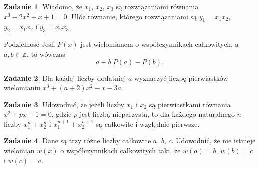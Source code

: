 \documentclass{uoom}
\theoremstyle{definition}
\newtheorem{zadd}{Zadanie}
\newenvironment{zadanie}{
  \begin{zadd}
  }
  {
    \end{zadd}\vspace{\ooodstep}
  }
\def\Z{\mathbb{Z}}
\begin{document}

%

\begin{zadanie}
  Wiadomo, że $x_1$, $x_2$, $x_3$ są rozwiązaniami równania $x^3-2x^2+x+1=0$. Ułóż równanie, którego rozwiązaniami są $y_1=x_1x_2$, $y_2=x_1x_2$ i $y_3=x_2x_3$.
\end{zadanie}

\begin{mybox}{Podzielność}
  Jeśli $P(x)$ jest wielomianem o współczynnikach całkowitych, a $a,b\in\Z$, to wówczas
  $$a-b|P(a)-P(b).$$
\end{mybox}


\begin{zadanie}
  Dla każdej liczby dodatniej $a$ wyznaczyć liczbę pierwiastków wielomianiu $x^3+(a+2)x^2-x-3a$.
\end{zadanie}

\begin{zadanie}
  Udowodnić, że jeżeli liczby $x_1$ i $x_2$ są pierwiastkami równania $x^2+px-1=0$, gdzie $p$ jest liczbą nieparzystą, to dla każdego naturalnego $n$ liczby $x_1^n+x_2^n$ i $x_1^{n+1}+x_2^{n+1}$ są całkowite i względnie pierwsze.
\end{zadanie}

\begin{zadanie}
  Dane są trzy różne liczby całkowite $a$, $b$, $c$. Udowodnić, że nie istnieje wielomian $w(x)$ o współczynnikach całkowitych taki, że $w(a)=b$, $w(b)=c$ i $w(c)=a$.
\end{zadanie}
\end{document}
